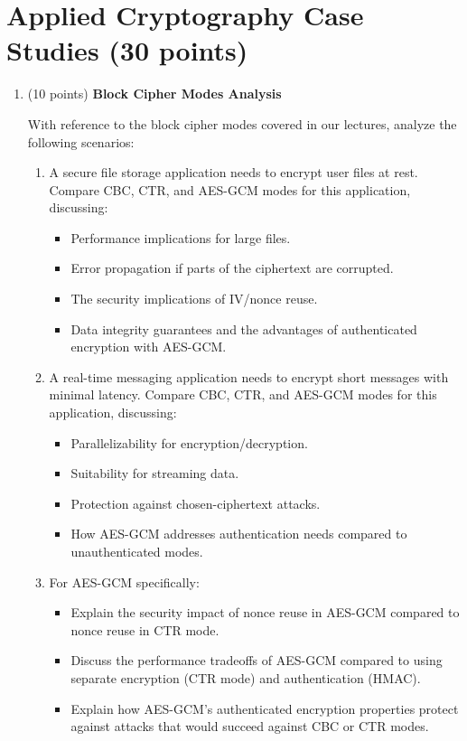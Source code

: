 \documentclass[10pt,a4paper,american]{exam}
\begin{document}
\section{Applied Cryptography Case Studies (30 points)}

\begin{enumerate}
	\item (10 points) \textbf{Block Cipher Modes Analysis}

	      With reference to the block cipher modes covered in our lectures, analyze the following scenarios:
	      \begin{enumerate}
		      \item A secure file storage application needs to encrypt user files at rest. Compare CBC, CTR, and AES-GCM modes for this application, discussing:
		            \begin{itemize}
			            \item Performance implications for large files.
			            \item Error propagation if parts of the ciphertext are corrupted.
			            \item The security implications of IV/nonce reuse.
			            \item Data integrity guarantees and the advantages of authenticated encryption with AES-GCM.
		            \end{itemize}
		      \item A real-time messaging application needs to encrypt short messages with minimal latency. Compare CBC, CTR, and AES-GCM modes for this application, discussing:
		            \begin{itemize}
			            \item Parallelizability for encryption/decryption.
			            \item Suitability for streaming data.
			            \item Protection against chosen-ciphertext attacks.
			            \item How AES-GCM addresses authentication needs compared to unauthenticated modes.
		            \end{itemize}
		      \item For AES-GCM specifically:
		            \begin{itemize}
			            \item Explain the security impact of nonce reuse in AES-GCM compared to nonce reuse in CTR mode.
			            \item Discuss the performance tradeoffs of AES-GCM compared to using separate encryption (CTR mode) and authentication (HMAC).
			            \item Explain how AES-GCM's authenticated encryption properties protect against attacks that would succeed against CBC or CTR modes.
		            \end{itemize}
	      \end{enumerate}


\end{enumerate}
\end{document}
